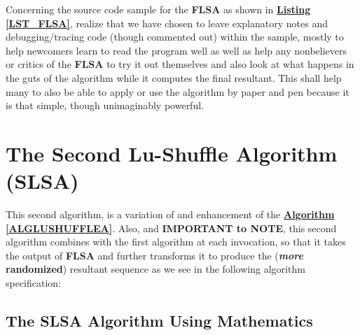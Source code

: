 \documentclass[a4paper, 18pt]{book} %
\begin{document}
Concerning the source code sample for the \textbf{FLSA} as shown in \textbf{\hyperref[LST_FLSA]{Listing \ref{LST_FLSA}}}, realize that we have chosen to leave explanatory notes and debugging/tracing code (though commented out) within the sample, mostly to help newcomers learn to read the program well as well as help any nonbelievers or critics of the \textbf{FLSA} to try it out themselves and also look at what happens in the guts of the algorithm while it computes the final resultant. This shall help many to also be able to apply or use the algorithm by paper and pen because it is that simple, though unimaginably powerful.


\section{The Second Lu-Shuffle Algorithm (SLSA)}
\label{APPSLSA}

This second algorithm, is a variation of and enhancement of the \textbf{\hyperref[ALGLUSHUFFLEA]{Algorithm \ref{ALGLUSHUFFLEA}}}. Also, and \textbf{IMPORTANT to NOTE}, this second algorithm combines with the first algorithm at each invocation, so that it takes the output of \textbf{FLSA} and further transforms it to produce the (\textbf{\textit{more} randomized}) resultant  sequence as we see in the following algorithm specification:

\subsection{The SLSA Algorithm Using Mathematics}
\end{document}
